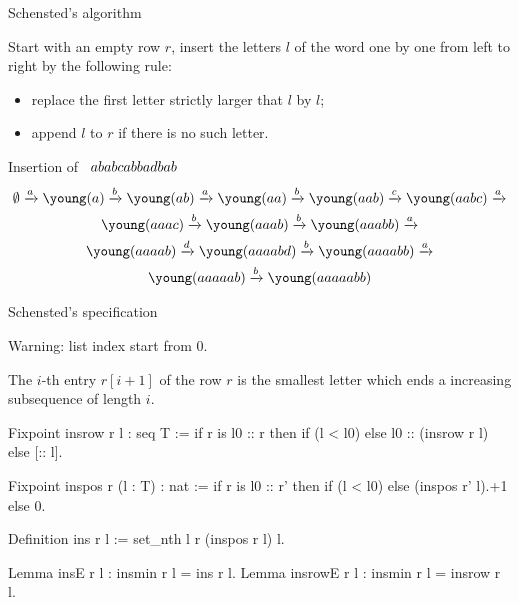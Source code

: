 \documentclass[compress,11pt]{beamer}
\renewcommand{\emph}[1]{{\color{red} #1}}
\begin{document}
\begin{frame}[fragile]{Schensted's algorithm}

  \begin{ALGO}
    Start with an empty row $r$, insert the letters $l$ of the word one by one
    from left to right by the following rule:
    \begin{itemize}
    \item replace the first letter strictly larger that $l$ by $l$;
    \item append $l$ to $r$ if there is no such letter.
    \end{itemize}
  \end{ALGO}
  \bigskip

  Insertion of $\begin{array}{c@{}c@{}c@{}c@{}c@{}c@{}c@{}c@{}c@{}c@{}c@{}c@{}c}
    a&b&a&b&c&a&b&b&a&d&b&a&b\\
  \end{array}$
  \begin{multline*}
  \emptyset\ar{a}\young(a)\ar{b}\young(ab)\ar{a}\young(aa)\ar{b}\young(aab)
  \ar{c}\young(aabc)\ar{a}\\
  \young(aaac)\ar{b}\young(aaab)\ar{b}\young(aaabb)\ar{a}\\\young(aaaab)\ar{d}
  \young(aaaabd)\ar{b}\young(aaaabb)\ar{a}\\
  \young(aaaaab)\ar{b}\young(aaaaabb)
  \end{multline*}
\end{frame}

\begin{frame}[fragile]{Schensted's specification}

  \emph{Warning}: list index start from $0$.
  \bigskip

  \begin{THEO}[Schensted 1961]
    The $i$-th entry $r[i+1]$ of the row $r$ is the smallest letter which ends
    a increasing subsequence of length $i$.
  \end{THEO}
\end{frame}

\begin{frame}[fragile]

  \begin{coqcode}
Fixpoint insrow r l : seq T :=
  if r is l0 :: r then
    if (l < l0)%
    else l0 :: (insrow r l)
  else [:: l].

Fixpoint inspos r (l : T) : nat :=
  if r is l0 :: r' then
    if (l < l0)%
    else (inspos r' l).+1
  else 0.

Definition ins r l := set_nth l r (inspos r l) l.

Lemma insE r l : insmin r l = ins r l.
Lemma insrowE r l : insmin r l = insrow r l.
  \end{coqcode}
\end{frame}
\end{document}
